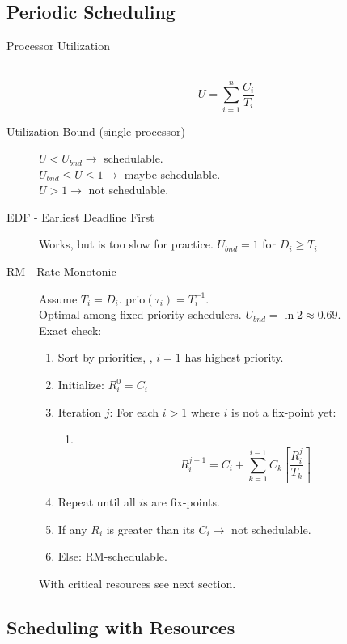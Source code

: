 \subsection*{Periodic Scheduling}
\begin{description}
	\item[Processor Utilization] \ 
	\[ U = \sum_{i=1}^n \frac{C_i}{T_i} \]
	\item[Utilization Bound (single processor)] $U < U_{bnd} \rightarrow$
	schedulable.\\
	$U_{bnd} \leq U \leq 1 \rightarrow$ maybe schedulable.\\
	$U > 1 \rightarrow$ not schedulable.
	\item[EDF - Earliest Deadline First] Works, but is too slow for practice.
	$U_{bnd} = 1$ for $D_i \geq T_i$
	\item[RM - Rate Monotonic] Assume $T_i = D_i$. prio$(\tau_i) = T_i^{-1}$.\\
	Optimal among fixed priority schedulers. $U_{bnd} = \ln 2 \approx 0.69$.\\
	Exact check:
	\begin{enumerate}
		\item Sort by priorities, \ie, $i = 1$ has highest priority.
		\item Initialize: $R^0_i = C_i$
		\item Iteration $j$: For each $i > 1$ where $i$ is not a fix-point yet:
			\begin{enumerate}
				\item \ 
				\[ R_i^{j+1} = C_i + \sum_{k=1}^{i-1} C_k \left\lceil \frac{R_i^j}{T_k}
				\right\rceil \]
			\end{enumerate}
		\item Repeat until all $i$s are fix-points.
		\item If any $R_i$ is greater than its $C_i \rightarrow$ not schedulable.
		\item Else: RM-schedulable. 
	\end{enumerate}
	With critical resources see next section.
\end{description}

\subsection*{Scheduling with Resources}

